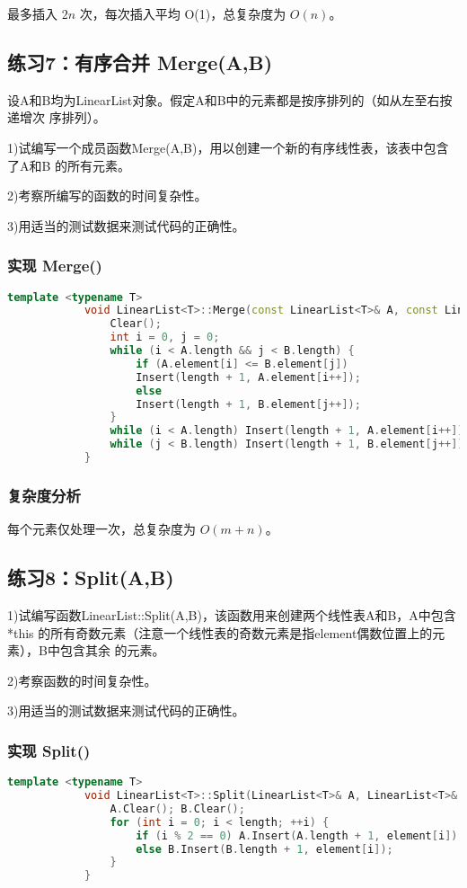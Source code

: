 \documentclass[UTF8]{ctexart}
\begin{document}
		最多插入 $ 2n $ 次，每次插入平均 O(1)，总复杂度为 $ O(n) $。
		\subsection{练习7：有序合并 Merge(A,B)}
		设A和B均为LinearList对象。假定A和B中的元素都是按序排列的（如从左至右按递增次
		序排列）。
		
		1)试编写一个成员函数Merge(A,B)，用以创建一个新的有序线性表，该表中包含了A和B
		的所有元素。
		
		2)考察所编写的函数的时间复杂性。
		
		3)用适当的测试数据来测试代码的正确性。
		
		\subsubsection{实现 Merge()}
		
		\begin{lstlisting}[language=C++]
			template <typename T>
			void LinearList<T>::Merge(const LinearList<T>& A, const LinearList<T>& B) {
				Clear();
				int i = 0, j = 0;
				while (i < A.length && j < B.length) {
					if (A.element[i] <= B.element[j])
					Insert(length + 1, A.element[i++]);
					else
					Insert(length + 1, B.element[j++]);
				}
				while (i < A.length) Insert(length + 1, A.element[i++]);
				while (j < B.length) Insert(length + 1, B.element[j++]);
			}
		\end{lstlisting}
		\subsubsection{复杂度分析}
		
		每个元素仅处理一次，总复杂度为 $ O(m+n) $。
		\subsection{练习8：Split(A,B)}
		1)试编写函数LinearList::Split(A,B)，该函数用来创建两个线性表A和B，A中包含*this
		的所有奇数元素（注意一个线性表的奇数元素是指element偶数位置上的元素），B中包含其余
		的元素。
		
		2)考察函数的时间复杂性。
		
		3)用适当的测试数据来测试代码的正确性。
		\subsubsection{实现 Split()}
		
		\begin{lstlisting}[language=C++]
			template <typename T>
			void LinearList<T>::Split(LinearList<T>& A, LinearList<T>& B) {
				A.Clear(); B.Clear();
				for (int i = 0; i < length; ++i) {
					if (i % 2 == 0) A.Insert(A.length + 1, element[i]);
					else B.Insert(B.length + 1, element[i]);
				}
			}
		\end{lstlisting}
\end{document}

